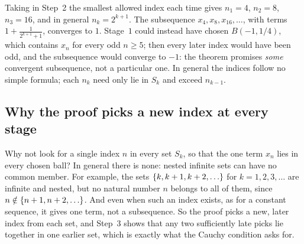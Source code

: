 Taking in Step~2 the smallest allowed index each time gives $n_1=4$, $n_2=8$, $n_3=16$, and in general $n_k=2^{k+1}$. The subsequence $x_4,x_8,x_{16},\ldots$, with terms $1+\tfrac1{2^{k+1}+1}$, converges to $1$. Stage~$1$ could instead have chosen $B(-1,1/4)$, which contains $x_n$ for every odd $n\ge5$; then every later index would have been odd, and the subsequence would converge to $-1$: the theorem promises \emph{some} convergent subsequence, not a particular one. In general the indices follow no simple formula; each $n_k$ need only lie in $S_k$ and exceed $n_{k-1}$.

\subsection*{Why the proof picks a new index at every stage}
Why not look for a single index $n$ in every set $S_k$, so that the one term $x_n$ lies in every chosen ball? In general there is none: nested infinite sets can have no common member. For example, the sets $\left\{k,k+1,k+2,\ldots\right\}$ for $k=1,2,3,\ldots$ are infinite and nested, but no natural number $n$ belongs to all of them, since $n\notin\left\{n+1,n+2,\ldots\right\}$. And even when such an index exists, as for a constant sequence, it gives one term, not a subsequence. So the proof picks a new, later index from each set, and Step~3 shows that any two sufficiently late picks lie together in one earlier set, which is exactly what the Cauchy condition asks for.

